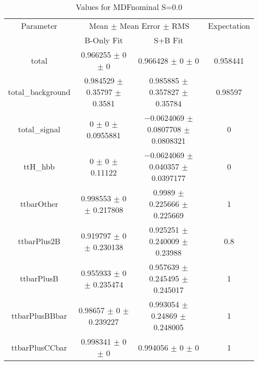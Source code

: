 \begin{table}
\centering
\caption{Values for MDFnominal S=0.0}
\begin{tabular}{cccc}
\toprule
Parameter & \multicolumn{2}{c}{Mean $\pm$ Mean Error $\pm$ RMS} & Expectation\\
 & B-Only Fit & S+B Fit & \\
\midrule
total & \num{0.966255} $\pm$ \num{0} $\pm$ \num{0} & \num{0.966428} $\pm$ \num{0} $\pm$ \num{0} & \num{0.958441}\\
total\_background & \num{0.984529} $\pm$ \num{0.35797} $\pm$ \num{0.3581} & \num{0.985885} $\pm$ \num{0.357827} $\pm$ \num{0.35784} & \num{0.98597}\\
total\_signal & \num{0} $\pm$ \num{0} $\pm$ \num{0.0955881} & \num{-0.0624069} $\pm$ \num{0.0807708} $\pm$ \num{0.0808321} & \num{0}\\
ttH\_hbb & \num{0} $\pm$ \num{0} $\pm$ \num{0.11122} & \num{-0.0624069} $\pm$ \num{0.040357} $\pm$ \num{0.0397177} & \num{0}\\
ttbarOther & \num{0.998553} $\pm$ \num{0} $\pm$ \num{0.217808} & \num{0.9989} $\pm$ \num{0.225666} $\pm$ \num{0.225669} & \num{1}\\
ttbarPlus2B & \num{0.919797} $\pm$ \num{0} $\pm$ \num{0.230138} & \num{0.925251} $\pm$ \num{0.240009} $\pm$ \num{0.23988} & \num{0.8}\\
ttbarPlusB & \num{0.955933} $\pm$ \num{0} $\pm$ \num{0.235474} & \num{0.957639} $\pm$ \num{0.245495} $\pm$ \num{0.245017} & \num{1}\\
ttbarPlusBBbar & \num{0.98657} $\pm$ \num{0} $\pm$ \num{0.239227} & \num{0.993054} $\pm$ \num{0.24869} $\pm$ \num{0.248005} & \num{1}\\
ttbarPlusCCbar & \num{0.998341} $\pm$ \num{0} $\pm$ \num{0} & \num{0.994056} $\pm$ \num{0} $\pm$ \num{0} & \num{1}\\
\bottomrule
\end{tabular}
\end{table}